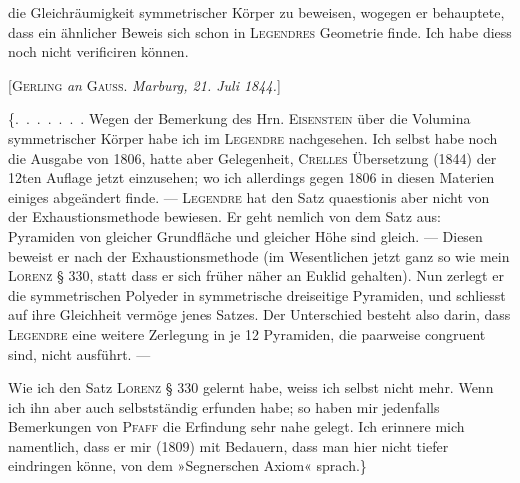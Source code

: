%
\noindent die Gleichräumigkeit symmetrischer Körper zu beweisen, wogegen er
behauptete, dass ein ähnlicher Beweis sich schon in \textsc{Legendres}
Geometrie finde. Ich habe diess noch nicht verificiren können.

\begin{center}
[\textsc{Gerling} \emph{an} \textsc{Gauss}. \emph{Marburg, 21. Juli 1844.}]
\end{center}

\{\mbox{.\ .\ .\ .\ .\ .\ .} Wegen der Bemerkung des Hrn. \textsc{Eisenstein} über die
Volumina symmetrischer Körper habe ich im \textsc{Legendre} nachgesehen.
Ich selbst habe noch die Ausgabe von 1806, hatte aber Gelegenheit,
\textsc{Crelles} Übersetzung (1844) der 12ten Auflage jetzt einzusehen; wo
ich allerdings gegen 1806 in diesen Materien einiges abgeändert finde. ---
\textsc{Legendre} hat den Satz quaestionis aber nicht  von der
Exhaustionsmethode bewiesen. Er geht nemlich von dem Satz aus: Pyramiden
von gleicher Grundfläche und gleicher Höhe sind gleich. --- Diesen beweist
er nach der Exhaustionsmethode (im Wesentlichen jetzt ganz so wie mein
\textsc{Lorenz} § 330, statt dass er sich früher näher an Euklid gehalten).
Nun zerlegt er die symmetrischen Polyeder in symmetrische dreiseitige
Pyramiden, und schliesst auf ihre Gleichheit vermöge jenes Satzes. Der
Unterschied besteht also darin, dass \textsc{Legendre} eine weitere
Zerlegung in je 12 Pyramiden, die paarweise congruent sind, nicht ausführt. ---

Wie ich den Satz \textsc{Lorenz} § 330 gelernt habe, weiss ich selbst nicht
mehr. Wenn ich ihn aber auch selbstständig erfunden habe; so haben mir
jedenfalls Bemerkungen von \textsc{Pfaff} die Erfindung sehr nahe gelegt.
Ich erinnere mich namentlich, dass er mir (1809) mit Bedauern, dass man
hier nicht tiefer eindringen könne, von dem »Segnerschen Axiom« sprach.\}

